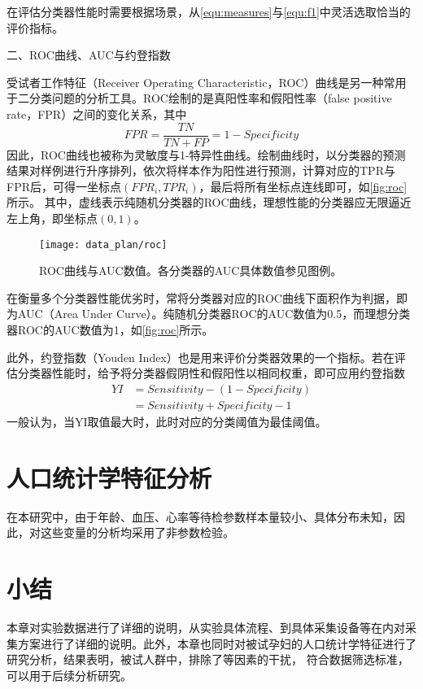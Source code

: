 在评估分类器性能时需要根据场景，从\autoref{equ:measures}与\autoref{equ:f1}中灵活选取恰当的评价指标。

二、ROC曲线、AUC与约登指数

受试者工作特征（Receiver Operating Characteristic，ROC）曲线是另一种常用于二分类问题的分析工具。ROC绘制的是真阳性率和假阳性率（false positive rate，FPR）之间的变化关系，其中
\begin{equation}
      \label{equ:fpr}
      FPR=\frac{TN}{TN+FP}=1-Specificity
\end{equation}
因此，ROC曲线也被称为灵敏度与1-特异性曲线。绘制曲线时，以分类器的预测结果对样例进行升序排列，依次将样本作为阳性进行预测，计算对应的TPR与FPR后，可得一坐标点$({FPR}_i,{TPR}_i)$，最后将所有坐标点连线即可，如\autoref{fig:roc}所示。
其中，虚线表示纯随机分类器的ROC曲线，理想性能的分类器应无限逼近左上角，即坐标点$(0,1)$。
\begin{figure}[htbp]
      \centering
      \texttt{[image: data\_plan/roc]}
      \caption[ROC曲线与AUC数值]{\label{fig:roc}ROC曲线与AUC数值。各分类器的AUC具体数值参见图例。}
\end{figure}

在衡量多个分类器性能优劣时，常将分类器对应的ROC曲线下面积作为判据，即为AUC（Area Under Curve）。纯随机分类器ROC的AUC数值为0.5，而理想分类器ROC的AUC数值为1，如\autoref{fig:roc}所示。

此外，约登指数（Youden Index）也是用来评价分类器效果的一个指标。若在评估分类器性能时，给予将分类器假阴性和假阳性以相同权重，即可应用约登指数
\begin{equation}
      \label{equ:yi}
      \begin{aligned}
            YI&=Sensitivity-(1-Specificity)\\
            &=Sensitivity+Specificity-1
      \end{aligned}
\end{equation}
一般认为，当YI取值最大时，此时对应的分类阈值为最佳阈值\cite{cwl}。

\section{人口统计学特征分析}
在本研究中，由于年龄、血压、心率等待检参数样本量较小、具体分布未知，因此，对这些变量的分析均采用了非参数检验。
\section{小结}
本章对实验数据进行了详细的说明，从实验具体流程、到具体采集设备等在内对采集方案进行了详细的说明。此外，本章也同时对被试孕妇的人口统计学特征进行了研究分析，结果表明，被试人群中，排除了等因素的干扰，
符合数据筛选标准，可以用于后续分析研究。  
